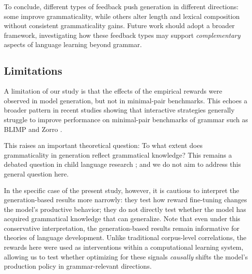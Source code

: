 To conclude, different types of feedback push generation in different directions: some improve grammaticality, while others alter length and lexical composition without consistent grammaticality gains.
Future work should adopt a broader framework, investigating how these feedback types may support \textit{complementary} aspects of language learning beyond grammar.

\subsection*{Limitations}

A limitation of our study is that the effects of the empirical rewards were observed in model generation, but not in minimal-pair benchmarks. This echoes a broader pattern in recent studies showing that interactive strategies generally struggle to improve performance on minimal-pair benchmarks of grammar such as BLIMP and Zorro \cite{zhao-etal-2023-babystories, padovani2025dialogue, nikolaus_fourtassi_2026, stopler2025towards}.

This raises an important theoretical question: To what extent does grammaticality in generation reflect grammatical knowledge? 
This remains a debated question in child language research \cite{ambridge2011child, chater2018language};
and we do not aim to address this general question here.


In the specific case of the present study, however, it is cautious to interpret the generation-based results more narrowly: they test how reward fine-tuning changes the model’s productive behavior; they do not directly test whether the model has acquired grammatical knowledge that can generalize. 
Note that even under this conservative interpretation, the generation-based results remain informative for theories of language development. Unlike traditional corpus-level correlations, the rewards here were used as interventions within a computational learning system, allowing us to test whether optimizing for these signals \textit{causally} shifts the model’s production policy in grammar-relevant directions.


